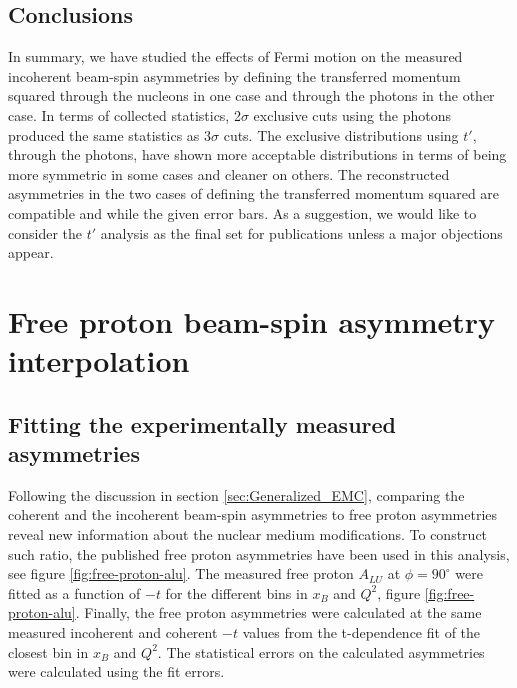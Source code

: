 \section*{Conclusions}
In summary, we have studied the effects of Fermi motion on the measured 
incoherent beam-spin asymmetries by defining the transferred momentum squared 
through the nucleons in one case and through the photons in the other case. In 
terms of collected statistics, 2$\sigma$ exclusive cuts using the photons 
produced the same statistics as 3$\sigma$ cuts. The exclusive distributions 
using $t'$, through the photons, have shown more acceptable distributions in 
terms of being more symmetric in some cases and cleaner on others. The 
reconstructed asymmetries in the two cases of defining the transferred momentum 
squared are compatible and while the given error bars. As a suggestion, we 
would like to consider the $t'$ analysis as the final set for publications 
unless a major objections appear.

\chapter{Free proton beam-spin asymmetry interpolation} 
\label{app:free-proton-alu}
\section{Fitting the experimentally measured asymmetries} \label{fit_int} 
Following the discussion in section \ref{sec:Generalized_EMC}, comparing the 
coherent and the incoherent beam-spin asymmetries to free proton asymmetries 
reveal new information about the nuclear medium modifications. To construct 
such ratio, the published free proton asymmetries \cite{FX_BSA} have been used 
in this analysis, see figure \ref{fig:free-proton-alu}. The measured free 
proton $A_{LU}$ at $\phi = 90^{\circ}$ were fitted as a function of $-t$ for 
the different bins in $x_B$ and $Q^2$, figure \ref{fig:free-proton-alu}.  
Finally, the free proton asymmetries were calculated at the same measured 
incoherent and coherent $-t$ values from the t-dependence fit of the closest 
bin in $x_B$ and $Q^2$.  The statistical errors on the calculated asymmetries 
were calculated using the fit errors.\\ 



